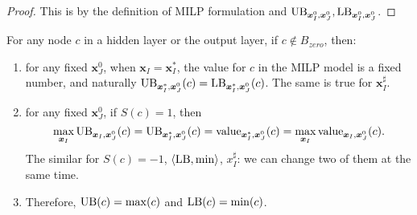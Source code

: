 			\begin{proof}
				This is by the definition of MILP formulation and $\mathrm{UB}_{\boldsymbol{x}^0_I,\boldsymbol{x}^0_J}, \mathrm{LB}_{\boldsymbol{x}^0_I,\boldsymbol{x}^0_J}$. 
			\end{proof}
			
	
			
			
			
	

		\begin{lemma} \label{lem:main}
				For any node $c$ in a hidden layer or the output layer, if $c\notin B_{zero}$, then:		\begin{enumerate}
					\item for any fixed $\boldsymbol{x}^0_J$, when  $\boldsymbol{x}_I=\boldsymbol{x}^*_I$, the value for $c$ in the MILP model is a fixed number, and naturally $\mathrm{UB}_{\boldsymbol{x}^*_I,\boldsymbol{x}^0_J}(c)=\mathrm{LB}_{\boldsymbol{x}^*_I,\boldsymbol{x}^0_J}(c)$. The same is true for $\boldsymbol{x}^\sharp_I$.
					
					\item for any fixed $\boldsymbol{x}^0_J$, if $S(c)=1$, then $$\max_{\boldsymbol{x}_I} \mathrm{UB}_{\boldsymbol{x}_I,\boldsymbol{x}^0_J}(c)=\mathrm{UB}_{\boldsymbol{x}^*_I,\boldsymbol{x}^0_J}(c)= {\textrm{value}}_{\boldsymbol{x}^*_I,\boldsymbol{x}^0_J}(c) = \max_{\boldsymbol{x}_I} {\textrm{value}}_{\boldsymbol{x}_I,\boldsymbol{x}^0_J}(c).$$ The similar for $S(c)=-1$, $\langle \mathrm{LB},\min\rangle$, $x^\sharp_I$: we can change two of them at the same time.
					
					\item Therefore, $\mathrm{UB}(c)=\max(c)$ and $\mathrm{LB}(c)=\min(c)$.
				\end{enumerate}
				
				
				
			\end{lemma}
			


